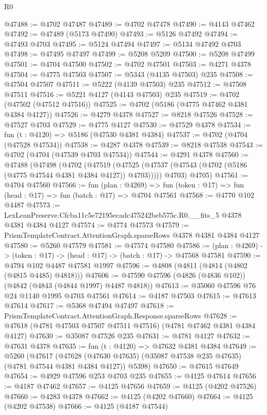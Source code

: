 \begin{lexlean}{R0}
\begin{coremodule}
@47488 := @4702 @47487
@47489 := @4702 @47478
@47490 := @4143 @47462
@47492 := @47489 (@5173 @47490)
@47493 := @5126 @47492
@47494 := @47493 @4703
@47495 := @5124 @47494
@47497 := @5134 @47492 @4703
@47498 := @47495 @47497
@47499 := @5208 @5209
@47500 := @5208 @47499
@47501 := @4704 @47500
@47502 := @4702 @47501
@47503 := @4271 @4378
@47504 := @4775 @47503
@47507 := @5343 (@4135 @47503) @235
@47508 := @47504 @47507
@47511 := @5222 (@4139 @47503) @235
@47512 := @47508 @47511
@47516 := @5221 @4127 (@4143 @47503) @235
@47519 := @4702 (@47502 (@47512 @47516))
@47525 := @4702 (@5186 (@4775 @47462 @4381 @4384 @4127))
@47526 := @4279 @4378
@47527 := @8218 @47526
@47528 := @47527 @4703
@47529 := @4775 @4127
@47530 := @47529 @4378
@47534 := fun (t : @4120) => @5186 (@47530 @4381 @4384)
@47537 := @4702 (@4704 (@47528 @47534))
@47538 := @4287 @4378
@47539 := @8218 @47538
@47543 := @4702 (@4704 (@47539 @4703 @47534))
@47544 := @4291 @4378
@47560 := @47488
    (@47498
      (@4702
        (@47519 (@47525 (@47537 (@47543 (@4702 (@5186 (@4775 @47544 @4381 @4384 @4127)) @4703)))))
        @4703)
      @4705)
@47561 := @4704 @47560
@47566 := fun (plan : @4269) =>
  fun (token : @17) => fun (head : @17) => fun (batch : @17) => @4704 @47561
@47568 := @4770 @102 @4487
@47573 := LexLeanPreserve.Cfcba11c5e72195ecadc475242beb575c.R0.__fits_5 @4378 @4381 @4384 @4127
@47574 := @4774 @47573
@47579 := PrismTemplateContract.AttentionGraph.sparseRows @4378 @4381 @4384 @4127
@47580 := @5260 @47579
@47581 := @47574 @47580
@47586 := (plan : @4269) -> (token : @17) -> (head : @17) -> (batch : @17) -> @47568 @47581
@47590 := @4794 @102 @4487 @47581 @1997
@47596 := @4808 (@4811 (@4814 (@4802 (@4815 @4485) @4818)))
@47606 := @47590 @47596 (@4826 (@4836 @102)) (@4842 (@4843 (@4844 @1997) @4487 @4818))
@47613 := @35060 @47596 @76 @24 @1140 @1995 @4703 @47561
@47614 := @4187 @47503
@47615 := @47613 @47614
@47617 := @5368 @47494 @47497
@47618 := PrismTemplateContract.AttentionGraph.Response.sparseRows
@47628 := @47618 (@4781 @47503 @47507 @47511 @47516) (@4781 @47462 @4381 @4384 @4127)
@47630 := @35087 @47526 @235
@47631 := @4781 @4127
@47632 := @47631 @4378
@47635 := fun (t : @4120) => @47632 @4381 @4384
@47649 := @5260
    (@47617
      (@47628 (@47630 @47635) (@35087 @47538 @235 @47635) (@4781 @47544 @4381 @4384 @4127))
      @5398)
@47650 := @47615 @47649
@47654 := @4929 @47596 @253 @4703 @235
@47655 := @4125 @47614
@47656 := @4187 @47462
@47657 := @4125 @47656
@47659 := @4125 (@4202 @47526)
@47660 := @4283 @4378
@47662 := @4125 (@4202 @47660)
@47664 := @4125 (@4202 @47538)
@47666 := @4125 (@4187 @47544)

\end{coremodule}
\end{lexlean}

